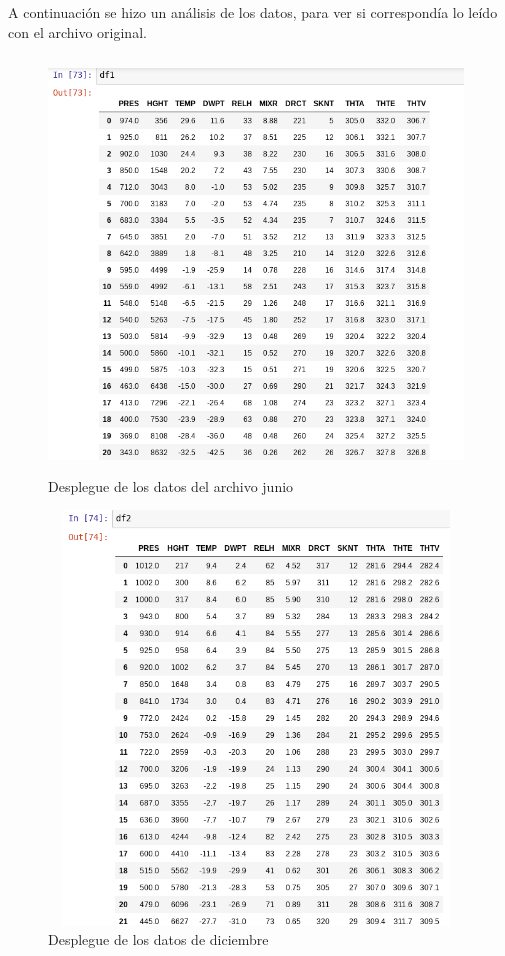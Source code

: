 \documentclass{article}
\begin{document}
\newpage

A continuación se hizo un análisis de los datos, para ver si correspondía lo leído con el archivo original.

\begin{figure}[h!]
  \includegraphics[width=11cm, height=11cm]{datos1.png}
  \caption{Desplegue de los datos del archivo junio}
  \label{fig: rap. de vientos y ráfagas}
\end{figure}

\newpage

\begin{figure}[h!]
  \includegraphics[width=11cm, height=11cm]{datos2.png}
  \caption{Desplegue de los datos de diciembre}
  \label{fig: rap. de vientos y ráfagas}
\end{figure}
\end{document}
